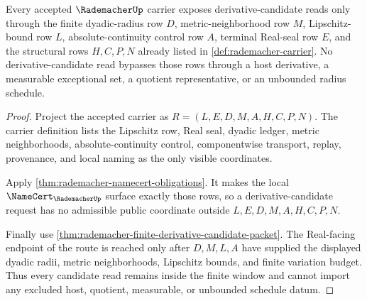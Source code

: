 \begin{theorem}
\label{thm:rademacher-difference-window-obligation}
Every accepted $\RademacherUp$ carrier exposes derivative-candidate reads only through the finite dyadic-radius row $D$, metric-neighborhood row $M$, Lipschitz-bound row $L$, absolute-continuity control row $A$, terminal Real-seal row $E$, and the structural rows $H,C,P,N$ already listed in \autoref{def:rademacher-carrier}. No derivative-candidate read bypasses those rows through a host derivative, a measurable exceptional set, a quotient representative, or an unbounded radius schedule.
\end{theorem}
\begin{proof}
Project the accepted carrier as $R=(L,E,D,M,A,H,C,P,N)$. The carrier definition lists the Lipschitz row, Real seal, dyadic ledger, metric neighborhoods, absolute-continuity control, componentwise transport, replay, provenance, and local naming as the only visible coordinates.

Apply \autoref{thm:rademacher-namecert-obligations}. It makes the local $\NameCert_{\RademacherUp}$ surface exactly those rows, so a derivative-candidate request has no admissible public coordinate outside $L,E,D,M,A,H,C,P,N$.

Finally use \autoref{thm:rademacher-finite-derivative-candidate-packet}. The Real-facing endpoint of the route is reached only after $D,M,L,A$ have supplied the displayed dyadic radii, metric neighborhoods, Lipschitz bounds, and finite variation budget. Thus every candidate read remains inside the finite window and cannot import any excluded host, quotient, measurable, or unbounded schedule datum.
\end{proof}

